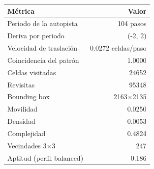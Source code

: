 \begin{tabular}{lr}
\toprule
M\'etrica & Valor \\
\midrule
Periodo de la autopista & 104 pasos \\
Deriva por periodo & (-2, 2) \\
Velocidad de traslaci\'on & 0.0272 celdas/paso \\
Coincidencia del patr\'on & 1.0000 \\
Celdas visitadas & 24652 \\
Revisitas & 95348 \\
Bounding box & 2163$\times$2135 \\
Movilidad & 0.0250 \\
Densidad & 0.0053 \\
Complejidad & 0.4824 \\
Vecindades 3$\times$3 & 247 \\
Aptitud (perfil balanced) & 0.186 \\
\bottomrule
\end{tabular}
